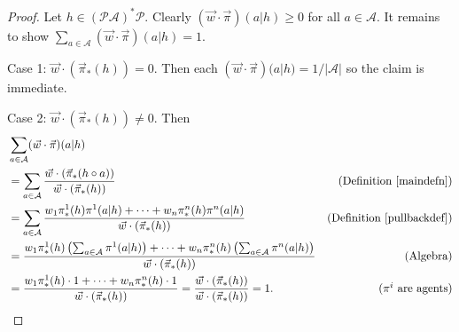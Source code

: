 \documentclass{article}
\begin{document}
\begin{proof}
    Let $h\in(\mathcal P\mathcal A)^*\mathcal P$.
    Clearly $(\vec w\cdot\vec\pi)(a|h)\geq 0$ for all $a\in\mathcal A$.
    It remains to show
    $\sum_{a\in\mathcal A}(\vec w\cdot\vec\pi)(a|h)=1$.

    Case 1: $\vec w\cdot (\vec\pi_*(h))=0$. Then
    each $(\vec w\cdot\vec\pi)(a|h)=1/|\mathcal A|$ so the
    claim is immediate.

    Case 2: $\vec w\cdot (\vec\pi_*(h))\not=0$. Then
    \begin{align*}
        &{} \sum_{a\in\mathcal A}(\vec w\cdot\vec\pi)(a|h)\\
            &= \sum_{a\in\mathcal A}
                \frac{\vec w\cdot (\vec\pi_*(h\circ a))}{\vec w\cdot (\vec\pi_*(h))}
                &\mbox{(Definition \ref{maindefn})}\\
            &= \sum_{a\in\mathcal A}
                \frac
                {w_1\pi^1_*(h)\pi^1(a|h)+\cdots+w_n\pi^n_*(h)\pi^n(a|h)}
                {\vec w\cdot(\vec\pi_*(h))}
                &\mbox{(Definition \ref{pullbackdef})}\\
            &= \frac{
                w_1\pi^1_*(h)\left(\mbox{$\sum_{a\in\mathcal A}\pi^1(a|h)$}\right)
                +\cdots+
                w_n\pi^n_*(h)\left(\mbox{$\sum_{a\in\mathcal A}\pi^n(a|h)$}\right)
                }
                {\vec w\cdot (\vec\pi_*(h))}
                &\mbox{(Algebra)}\\
            &= \frac
                {w_1\pi^1_*(h)\cdot 1 + \cdots + w_n\pi^n_*(h)\cdot1}
                {\vec w\cdot (\vec\pi_*(h))}
                =\frac{\vec w\cdot (\vec\pi_*(h))}{\vec w\cdot (\vec\pi_*(h))}=1.
                &\mbox{($\pi^i$ are agents)}
    \end{align*}
\end{proof}
\end{document}
